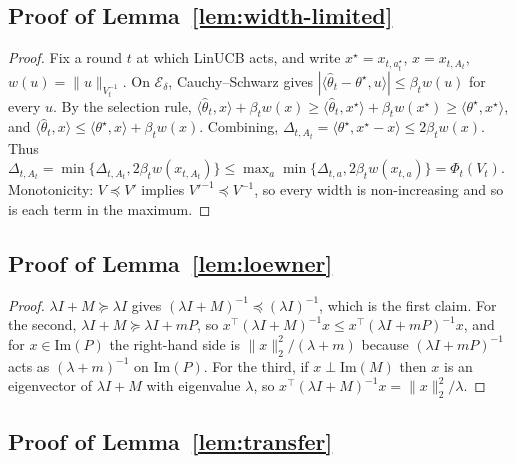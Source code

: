 \documentclass{article}
\theoremstyle{definition}
\theoremstyle{remark}
\theoremstyle{remark}
\newcommand{\wid}{w}
\begin{document}
\subsection{Proof of Lemma~\ref{lem:width-limited}}
\label{app:proof-width}

\begin{proof}
Fix a round $t$ at which LinUCB acts, and write $x^\star=x_{t,a_t^\star}$,
$x=x_{t,A_t}$, $\wid(u)=\|u\|_{V_t^{-1}}$. On $\mathcal E_\delta$, Cauchy--Schwarz
gives $|\langle\widehat\theta_t-\theta^\star,u\rangle|\le\beta_t\wid(u)$ for
every $u$. By the selection rule,
$\langle\widehat\theta_t,x\rangle+\beta_t\wid(x)\ge\langle\widehat\theta_t,x^\star\rangle+\beta_t\wid(x^\star)\ge\langle\theta^\star,x^\star\rangle$,
and $\langle\widehat\theta_t,x\rangle\le\langle\theta^\star,x\rangle+\beta_t\wid(x)$.
Combining, $\Delta_{t,A_t}=\langle\theta^\star,x^\star-x\rangle\le2\beta_t\wid(x)$.
Thus $\Delta_{t,A_t}=\min\{\Delta_{t,A_t},2\beta_t\wid(x_{t,A_t})\}\le\max_a\min\{\Delta_{t,a},2\beta_t\wid(x_{t,a})\}=\Phi_t(V_t)$.
Monotonicity: $V\preceq V'$ implies $V'^{-1}\preceq V^{-1}$, so every width is
non-increasing and so is each term in the maximum.
\end{proof}

\subsection{Proof of Lemma~\ref{lem:loewner}}
\label{app:proof-loewner}

\begin{proof}
$\lambda I+M\succeq\lambda I$ gives $(\lambda I+M)^{-1}\preceq(\lambda I)^{-1}$,
which is the first claim. For the second, $\lambda I+M\succeq\lambda I+mP$, so
$x^\top(\lambda I+M)^{-1}x\le x^\top(\lambda I+mP)^{-1}x$, and for
$x\in\mathrm{Im}(P)$ the right-hand side is $\|x\|_2^2/(\lambda+m)$ because
$(\lambda I+mP)^{-1}$ acts as $(\lambda+m)^{-1}$ on $\mathrm{Im}(P)$. For the
third, if $x\perp\mathrm{Im}(M)$ then $x$ is an eigenvector of $\lambda I+M$
with eigenvalue $\lambda$, so $x^\top(\lambda I+M)^{-1}x=\|x\|_2^2/\lambda$.
\end{proof}

\subsection{Proof of Lemma~\ref{lem:transfer}}
\label{app:proof-transfer}
\end{document}
